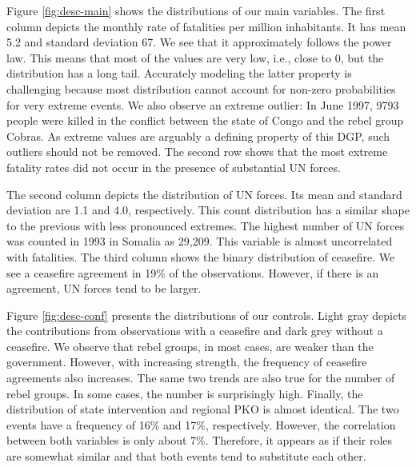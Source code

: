 \documentclass[12pt,english,a4paper,oneside]{article}
\begin{document}
\noindent
Figure \ref{fig:desc-main} shows the distributions of our main variables. The first column depicts the monthly rate of fatalities per million inhabitants. It has mean 5.2 and standard deviation 67. We see that it approximately follows the power law. This means that most of the values are very low, i.e., close to 0, but the distribution has a long tail. Accurately modeling the latter property is challenging because most distribution cannot account for non-zero probabilities for very extreme events. We also observe an extreme outlier: In June 1997, 9793 people were killed in the conflict between the state of Congo and the rebel group Cobras. As extreme values are arguably a defining property of this DGP, such outliers should not be removed. The second row shows that the most extreme fatality rates did not occur in the presence of substantial UN forces.

\noindent
The second column depicts the distribution of UN forces. Its mean and standard deviation are 1.1 and 4.0, respectively. This count distribution has a similar shape to the previous with less pronounced extremes. The highest number of UN forces was counted in 1993 in Somalia as 29,209. This variable is almost uncorrelated with fatalities.
The third column shows the binary distribution of ceasefire. We see a ceasefire agreement in 19\% of the observations. However, if there is an agreement, UN forces tend to be larger.

\noindent
Figure \ref{fig:desc-conf} presents the distributions of our controls. Light gray depicts the contributions from observations with a ceasefire and dark grey without a ceasefire. We observe that rebel groups, in most cases, are weaker than the government. However, with increasing strength, the frequency of ceasefire agreements also increases. The same two trends are also true for the number of rebel groups. In some cases, the number is surprisingly high. Finally, the distribution of state intervention and regional PKO is almost identical. The two events have a frequency of 16\% and 17\%, respectively. However, the correlation between both variables is only about 7\%. Therefore, it appears as if their roles are somewhat similar and that both events tend to substitute each other.

\phantom{This text will be invisible}
\end{document}
